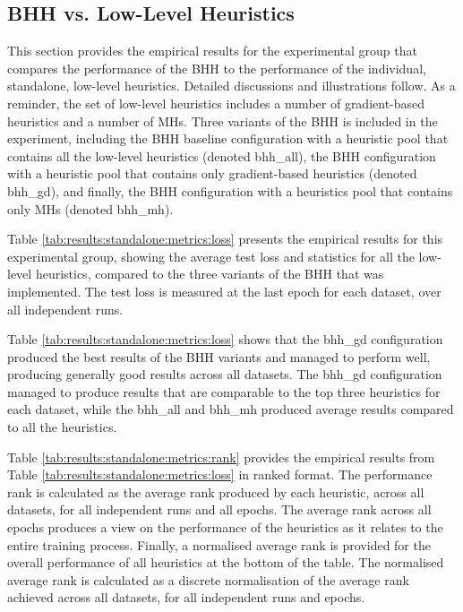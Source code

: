\subsection{BHH vs. Low-Level Heuristics}\label{sec:results:standalone}

This section provides the empirical results for the experimental group that compares the performance of the \acs{BHH} to the performance of the individual, standalone, low-level heuristics. Detailed discussions and illustrations follow. As a reminder, the set of low-level heuristics includes a number of gradient-based heuristics and a number of \acp{MH}. Three variants of the \acs{BHH} is included in the experiment, including the \acs{BHH} baseline configuration with a heuristic pool that contains all the low-level heuristics (denoted bhh\_all), the \acs{BHH} configuration with a heuristic pool that contains only gradient-based heuristics (denoted bhh\_gd), and finally, the \acs{BHH} configuration with a heuristics pool that contains only \acp{MH} (denoted bhh\_mh).

Table \ref{tab:results:standalone:metrics:loss} presents the empirical results for this experimental group, showing the average test loss and statistics for all the low-level heuristics, compared to the three variants of the \acs{BHH} that was implemented. The test loss is measured at the last epoch for each dataset, over all independent runs.

Table \ref{tab:results:standalone:metrics:loss} shows that the bhh\_gd configuration produced the best results of the \acs{BHH} variants and managed to perform well, producing generally good results across all datasets. The bhh\_gd configuration managed to produce results that are comparable to the top three heuristics for each dataset, while the bhh\_all and bhh\_mh produced average results compared to all the heuristics.

Table \ref{tab:results:standalone:metrics:rank} provides the empirical results from Table \ref{tab:results:standalone:metrics:loss} in ranked format. The performance rank is calculated as the average rank produced by each heuristic, across all datasets, for all independent runs and all epochs. The average rank across all epochs produces a view on the performance of the heuristics as it relates to the entire training process. Finally, a normalised average rank is provided for the overall performance of all heuristics at the bottom of the table. The normalised average rank is calculated as a discrete normalisation of the average rank achieved across all datasets, for all independent runs and epochs.

